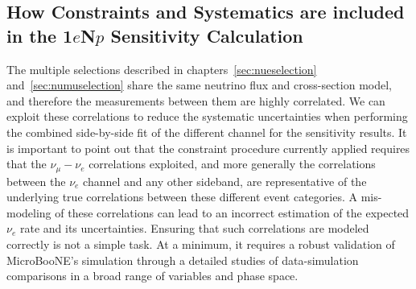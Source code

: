 
\subsection{How Constraints and Systematics are included in the 1$e$N$p$ Sensitivity Calculation }
\label{ssec:finalSensitivityCalc}

The multiple selections described in  chapters~\ref{sec:nueselection} and~\ref{sec:numuselection} share the same neutrino flux and cross-section model, and therefore the measurements between them are highly correlated. 
We can exploit these correlations to reduce the systematic uncertainties when performing the combined side-by-side fit of the different channel for the sensitivity results. 
It is important to point out that the constraint procedure currently applied requires that the $\nu_{\mu} - \nu_e$ correlations exploited, and more generally the correlations between the $\nu_e$ channel and any other sideband, are representative of the underlying true correlations between these different event categories. 
A mis-modeling of these correlations can lead to an incorrect estimation of the expected $\nu_e$ rate and its uncertainties. 
Ensuring that such correlations are modeled correctly is not a simple task. 
At a minimum, it requires a robust validation of MicroBooNE's simulation through a detailed studies of data-simulation comparisons in a broad range of variables and phase space. 

 
